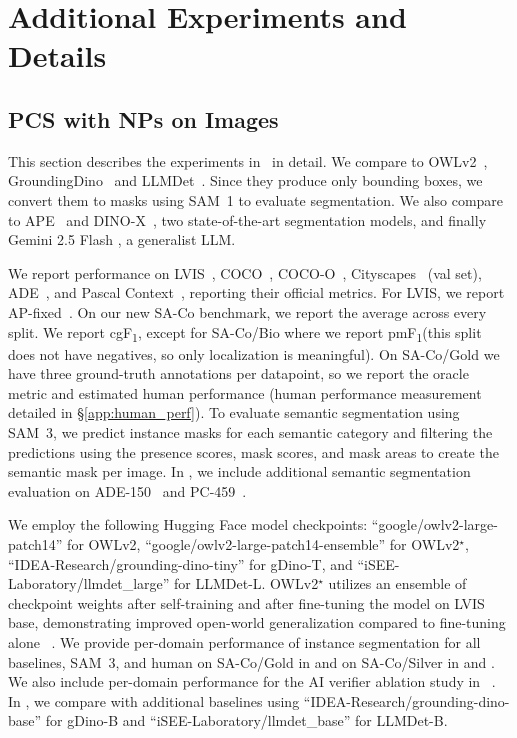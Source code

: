 \documentclass[]{fairmeta}
\newcommand{\samone}{SAM~1\xspace}
\newcommand{\model}{SAM~3\xspace}
\newcommand{\dsname}{{SA-Co}\xspace}
\newcommand{\evalgold}{{\dsname/Gold}\xspace}
\newcommand{\evalsilv}{{\dsname/Silver}\xspace}
\newcommand{\evalbio}{{\dsname/Bio}\xspace}
\newcommand{\cgf}{cgF\textsubscript{1}\xspace}
\newcommand{\pmf}{pmF\textsubscript{1}\xspace}
\begin{document}
\clearpage
\newpage

\section{Additional Experiments and Details}
\label{app:sec:experiments}

\subsection{PCS with NPs on Images}
\label{app:image_grounding}
This section describes the experiments in~ in detail.
We compare to OWLv2~\citep{minderer2024scalingopenvocabularyobjectdetection}, GroundingDino~\citep{groundingdino} and LLMDet~\citep{fu2025llmdet}. Since they produce only bounding boxes, we convert them to masks using \samone to evaluate segmentation. We also compare to APE~\citep{Shen_2024_CVPR} and DINO-X~\citep{ren2025dinoxunifiedvisionmodel}, two state-of-the-art segmentation models, and finally Gemini 2.5 Flash \citep{comanici2025gemini}, a generalist LLM.

We report performance on LVIS~\citep{lvis}, COCO~\citep{coco}, COCO-O~\citep{mao2023cocoobenchmarkobjectdetectors}, Cityscapes~\citep{Cordts2016Cityscapes} (val set), ADE~\citep{ade20k}, and Pascal Context~\citep{pascalcontext}, reporting their official metrics. For LVIS, we report AP-fixed~\citep{dave2022evaluatinglargevocabularyobjectdetectors}.
On our new \dsname benchmark, we report the average across every split. %
We report \cgf, except for \evalbio where we report \pmf (this split does not have negatives, so only localization is meaningful). 
On \evalgold we have three ground-truth annotations per datapoint, so 
we report the oracle metric and estimated human performance (human performance measurement detailed in \S\ref{app:human_perf}).
To evaluate semantic segmentation using \model, we predict instance masks for each semantic category and filtering the predictions using the presence scores, mask scores, and mask areas to create the semantic mask per image.
In , we include additional semantic segmentation evaluation on ADE-150~\citep{ade20k} and PC-459~\citep{pascalcontext}.

We employ the following Hugging Face model checkpoints: ``google/owlv2-large-patch14'' for OWLv2, ``google/owlv2-large-patch14-ensemble'' for OWLv2$^\star$, ``IDEA-Research/grounding-dino-tiny'' for gDino-T, and ``iSEE-Laboratory/llmdet\_large'' for LLMDet-L.
OWLv2$^\star$ utilizes an ensemble of checkpoint weights after self-training and after fine-tuning the model on LVIS base, demonstrating improved open-world generalization compared to fine-tuning alone ~\citep{minderer2024scalingopenvocabularyobjectdetection}. We provide per-domain performance of instance segmentation for all baselines, \model, and human on \evalgold in  and on \evalsilv in  and . We also include per-domain performance for the AI verifier ablation study in ~.
In , we compare with additional baselines using ``IDEA-Research/grounding-dino-base'' for gDino-B and ``iSEE-Laboratory/llmdet\_base'' for LLMDet-B.
\end{document}
